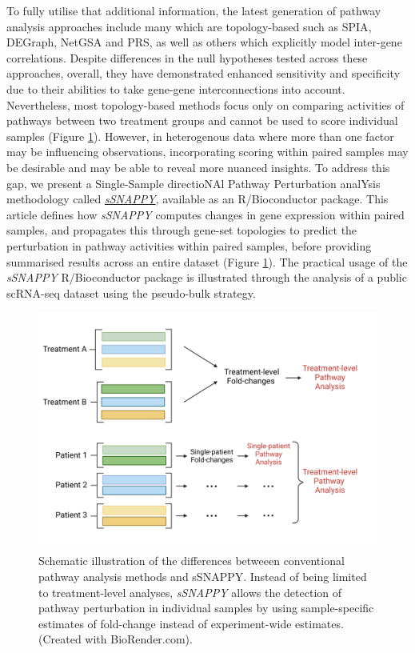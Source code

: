\documentclass[9pt,a4paper,]{extarticle}
\begin{document}
To fully utilise that additional information, the latest generation of pathway analysis approaches include many which are topology-based such as SPIA\citep{Tarca2009}, DEGraph\citep{Jacob2012}, NetGSA\citep{Ma2016} and PRS\citep{Ibrahim2012}, as well as others which explicitly model inter-gene correlations\citep{Wu2012}.
Despite differences in the null hypotheses tested across these approaches, overall, they have demonstrated enhanced sensitivity and specificity due to their abilities to take gene-gene interconnections into account\citep{Nguyen2019-va, Ma2019}.
Nevertheless, most topology-based methods focus only on comparing activities of pathways between two treatment groups and cannot be used to score individual samples (Figure \ref{fig:Figure1}).
However, in heterogenous data where more than one factor may be influencing observations\citep{Hanzelmann2013}, incorporating scoring within paired samples may be desirable and may be able to reveal more nuanced insights.
To address this gap, we present a Single-Sample directioNAl Pathway Perturbation analYsis methodology called \href{https://bioconductor.org/packages/sSNAPPY}{\emph{sSNAPPY}}, available as an R/Bioconductor package.
This article defines how \emph{sSNAPPY} computes changes in gene expression within paired samples, and propagates this through gene-set topologies to predict the perturbation in pathway activities within paired samples, before providing summarised results across an entire dataset (Figure \ref{fig:Figure1}).
The practical usage of the \emph{sSNAPPY} R/Bioconductor package is illustrated through the analysis of a public scRNA-seq dataset using the pseudo-bulk strategy.

\begin{figure}

{\centering \includegraphics[width=1\linewidth]{sSNAPPY_paper_files/figure-latex/Figure1} 

}

\caption{Schematic illustration of the differences betweeen conventional pathway analysis methods and sSNAPPY. Instead of being limited to treatment-level analyses, \textit{sSNAPPY} allows the detection of pathway perturbation in individual samples by using sample-specific estimates of fold-change instead of experiment-wide estimates. (Created with BioRender.com).}\label{fig:Figure1}
\end{figure}
\end{document}
